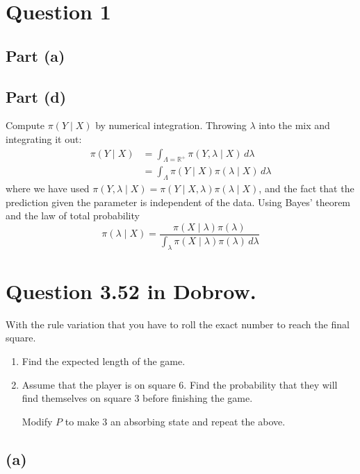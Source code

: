 \documentclass{article}
\begin{document}
\section{Question 1}
\subsection{Part (a)}
\subsection{Part (d)}
Compute $\pi(Y \mid X)$ by numerical integration.
Throwing $\lambda$ into the mix and integrating it out:
\begin{align*}
	\pi(Y \mid X) &= \int_{\Lambda = \mathbb R^+} \pi(Y, \lambda \mid X) \, d\lambda \\
	&= \int_\Lambda \pi(Y \mid X) \pi(\lambda \mid X) \, d\lambda
\end{align*}
where we have used $\pi(Y, \lambda \mid X) = \pi(Y \mid X, \lambda) \pi(\lambda \mid X)$,
and the fact that the prediction given the parameter is independent of the data.
Using Bayes' theorem and the law of total probability
$$ \pi(\lambda \mid X) = \frac{\pi(X \mid \lambda) \pi(\lambda)}{\int_\lambda \pi(X \mid \lambda) \pi(\lambda) \, d\lambda} $$

\section{Question \num{3.52} in Dobrow.}
With the rule variation that you have to roll the exact number to reach
the final square.
\begin{enumerate}[label=(\alph*)]
	\item Find the expected length of the game.
	\item Assume that the player is on square 6.
		Find the probability that they will find themselves on square 3 before finishing the game.

		Modify $P$ to make $3$ an absorbing state and repeat the above.
\end{enumerate}

\subsection{(a)}
\end{document}
